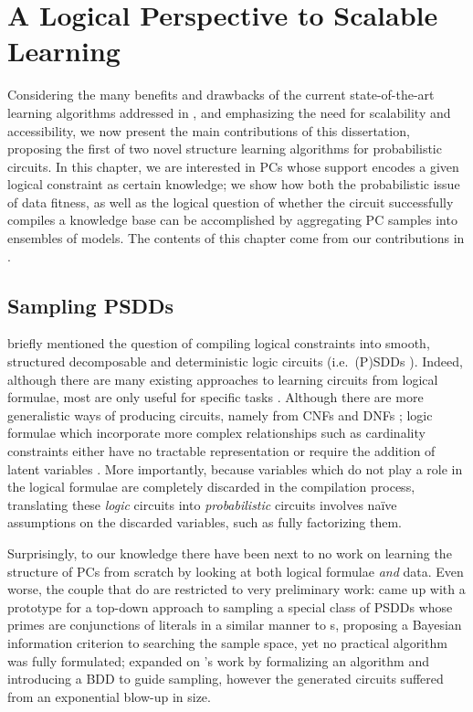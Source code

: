 \chapter{A Logical Perspective to Scalable Learning}
\label{ch:logical}

Considering the many benefits and drawbacks of the current state-of-the-art learning algorithms
addressed in , and emphasizing the need for scalability and accessibility, we now
present the main contributions of this dissertation, proposing the first of two novel structure
learning algorithms for probabilistic circuits. In this chapter, we are interested in PCs whose
support encodes a given logical constraint as certain knowledge; we show how both the probabilistic
issue of data fitness, as well as the logical question of whether the circuit successfully compiles
a knowledge base can be accomplished by aggregating PC samples into ensembles of models. The
contents of this chapter come from our contributions in \citet{geh21a}.

\section{Sampling PSDDs}
\label{sec:sampling}

 briefly mentioned the question of compiling logical constraints into smooth,
structured decomposable and deterministic logic circuits (i.e.\ (P)SDDs \cite{darwiche11,kisa14}).
Indeed, although there are many existing approaches to learning circuits from logical formulae,
most are only useful for specific tasks \citep{choi16,choi15,shen17,choi17}. Although there are
more generalistic ways of producing circuits, namely from CNFs and DNFs \citep{oztok15,choi13};
logic formulae which incorporate more complex relationships such as cardinality constraints either
have no tractable representation \citep{nishino16} or require the addition of latent variables
\citep{sinz05}. More importantly, because variables which do not play a role in the logical
formulae are completely discarded in the compilation process, translating these \emph{logic}
circuits into \emph{probabilistic} circuits involves naïve assumptions on the discarded variables,
such as fully factorizing them.

Surprisingly, to our knowledge there have been next to no work on learning the structure of PCs
from scratch by looking at both logical formulae \emph{and} data. Even worse, the couple that do
are restricted to very preliminary work: \citet{mattei19} came up with a \divclass{} prototype for
a top-down approach to sampling a special class of PSDDs whose primes are conjunctions of literals
in a similar manner to s, proposing a Bayesian information criterion to searching the
sample space, yet no practical algorithm was fully formulated; \citet{geh20} expanded on
\citeauthor{mattei19}'s work by formalizing an algorithm and introducing a BDD to guide sampling,
however the generated circuits suffered from an exponential blow-up in size.

